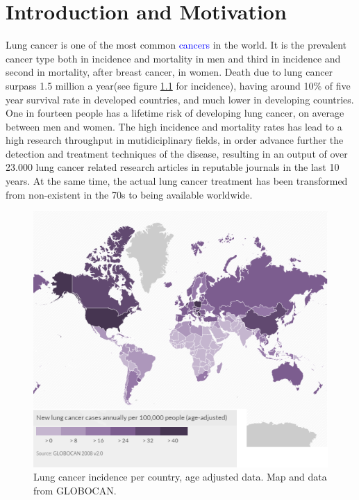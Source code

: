 \chapter{Introduction and Motivation}\label{ch:intro}


Lung cancer is one of the most common \textcolor{blue}{cancers} in the world. It is the prevalent cancer type both in incidence and mortality in men and third in incidence and second in mortality, after breast cancer, in women\cite{WCR2014}. Death due to lung cancer surpass 1.5 million a year(see figure \ref{fig:world} for incidence), having around 10\% of five year survival rate in developed countries, and much lower in developing countries\cite{CRUK2014}. One in fourteen people has a lifetime risk of developing lung cancer\cite{Harrisons2012}, on average between men and women. The high incidence and mortality rates has lead to a high research throughput in mutidiciplinary fields, in order advance further the detection and treatment techniques of the disease, resulting in an output of over 23.000 lung cancer related research articles in reputable journals in the last 10 years\cite{Nature2015}. At the same time, the  actual lung cancer treatment has been transformed from non-existent in the 70s to being available worldwide\cite{Comis2003}.


\begin{figure}[ht]
\begin{center}
\includegraphics[width=0.65\columnwidth]{StateOfArt/worldmap.png}
\caption[Lung cancer incidence in the world]{Lung cancer incidence per country, age adjusted data. Map and data from {GLOBOCAN}\cite{GLOBOCAN2010}.}
\label{fig:world}
\end{center}
\end{figure}

